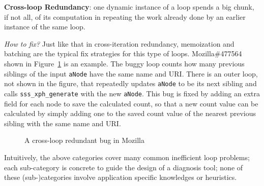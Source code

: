 {\textbf{Cross-loop Redundancy}}:
one dynamic instance of a loop spends a big chunk, if not all, of its
computation in repeating the work already done by an
earlier instance of the same loop.

{\textit{How to fix?}}
Just like that in cross-iteration redundancy, memoization and batching
are the typical fix strategies for this type of loops.
Mozilla\#477564 shown in Figure~\ref{fig:Mozilla477564} is an example. 
The buggy loop counts how many previous siblings of the input \texttt{aNode} have the same name and URI. 
There is an outer loop, not shown in the figure, that repeatedly updates
\texttt{aNode} to be its next sibling and calls
\texttt{sss\_xph\_generate} with the new \texttt{aNode}. 
This bug is fixed by adding an extra field for each node to save the calculated 
count, so that a new count value can be calculated by simply adding one to the
saved count value of the nearest previous sibling with the same name and URI.

\begin{figure}
\centering
{}
  \mbox{}
\caption{A cross-loop redundant bug in Mozilla }
\vspace{-0.05in}
\label{fig:Mozilla477564}\vspace{-0.05in}
\end{figure}



Intuitively, the above categories cover many common inefficient
loop problems; each sub-category is concrete to guide the design of a
diagnosis tool; none of these (sub-)categories involve application
specific knowledges or heuristics.
